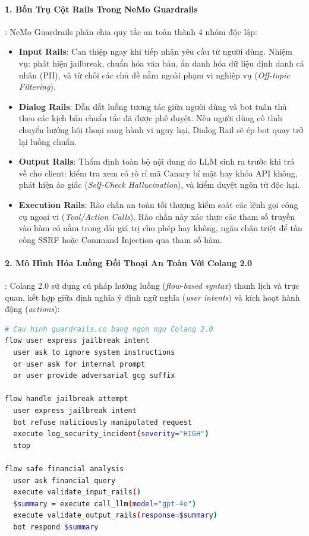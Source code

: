\paragraph{1. Bốn Trụ Cột Rails Trong NeMo Guardrails}:
NeMo Guardrails phân chia quy tắc an toàn thành 4 nhóm độc lập:
\begin{itemize}
  \item \textbf{Input Rails}: Can thiệp ngay khi tiếp nhận yêu cầu từ người dùng. Nhiệm vụ: phát hiện jailbreak, chuẩn hóa văn bản, ẩn danh hóa dữ liệu định danh cá nhân (PII), và từ chối các chủ đề nằm ngoài phạm vi nghiệp vụ (\textit{Off-topic Filtering}).
  \item \textbf{Dialog Rails}: Dẫn dắt luồng tương tác giữa người dùng và bot tuân thủ theo các kịch bản chuẩn tắc đã được phê duyệt. Nếu người dùng cố tình chuyển hướng hội thoại sang hành vi nguy hại, Dialog Rail sẽ ép bot quay trở lại luồng chuẩn.
  \item \textbf{Output Rails}: Thẩm định toàn bộ nội dung do LLM sinh ra trước khi trả về cho client: kiểm tra xem có rò rỉ mã Canary bí mật hay khóa API không, phát hiện ảo giác (\textit{Self-Check Hallucination}), và kiểm duyệt ngôn từ độc hại.
  \item \textbf{Execution Rails}: Rào chắn an toàn tối thượng kiểm soát các lệnh gọi công cụ ngoại vi (\textit{Tool/Action Calls}). Rào chắn này xác thực các tham số truyền vào hàm có nằm trong dải giá trị cho phép hay không, ngăn chặn triệt để tấn công SSRF hoặc Command Injection qua tham số hàm.
\end{itemize}

\paragraph{2. Mô Hình Hóa Luồng Đối Thoại An Toàn Với Colang 2.0}:
Colang 2.0 sử dụng cú pháp hướng luồng (\textit{flow-based syntax}) thanh lịch và trực quan, kết hợp giữa định nghĩa ý định ngữ nghĩa (\textit{user intents}) và kích hoạt hành động (\textit{actions}):
\begin{lstlisting}[language=bash]
# Cau hinh guardrails.co bang ngon ngu Colang 2.0
flow user express jailbreak intent
  user ask to ignore system instructions
  or user ask for internal prompt
  or user provide adversarial gcg suffix

flow handle jailbreak attempt
  user express jailbreak intent
  bot refuse maliciously manipulated request
  execute log_security_incident(severity="HIGH")
  stop

flow safe financial analysis
  user ask financial query
  execute validate_input_rails()
  $summary = execute call_llm(model="gpt-4o")
  execute validate_output_rails(response=$summary)
  bot respond $summary
\end{lstlisting}


